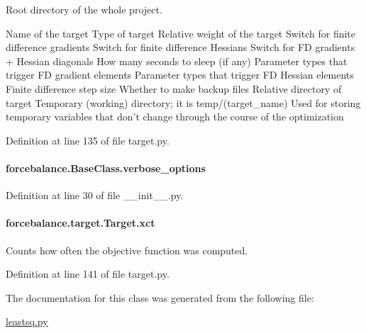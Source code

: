 Root directory of the whole project. 

Name of the target Type of target Relative weight of the target Switch for finite difference gradients Switch for finite difference Hessians Switch for F\-D gradients + Hessian diagonals How many seconds to sleep (if any) Parameter types that trigger F\-D gradient elements Parameter types that trigger F\-D Hessian elements Finite difference step size Whether to make backup files Relative directory of target Temporary (working) directory; it is temp/(target\-\_\-name) Used for storing temporary variables that don't change through the course of the optimization 

Definition at line 135 of file target.\-py.

\hypertarget{classforcebalance_1_1BaseClass_afd68efa29ccd2f320f4cf82198214aac}{
\paragraph[{verbose\-\_\-options}]{\setlength{\rightskip}{0pt plus 5cm}forcebalance.\-Base\-Class.\-verbose\-\_\-options\hspace{0.3cm}{\ttfamily [inherited]}}}\label{classforcebalance_1_1BaseClass_afd68efa29ccd2f320f4cf82198214aac}


Definition at line 30 of file \-\_\-\-\_\-init\-\_\-\-\_\-.\-py.

\hypertarget{classforcebalance_1_1target_1_1Target_aad2e385cfbf7b4a68f1c2cb41133fe82}{
\paragraph[{xct}]{\setlength{\rightskip}{0pt plus 5cm}forcebalance.\-target.\-Target.\-xct\hspace{0.3cm}{\ttfamily [inherited]}}}\label{classforcebalance_1_1target_1_1Target_aad2e385cfbf7b4a68f1c2cb41133fe82}


Counts how often the objective function was computed. 



Definition at line 141 of file target.\-py.



The documentation for this class was generated from the following file\-:\begin{DoxyCompactItemize}
\item 
\hyperlink{leastsq_8py}{leastsq.\-py}\end{DoxyCompactItemize}
